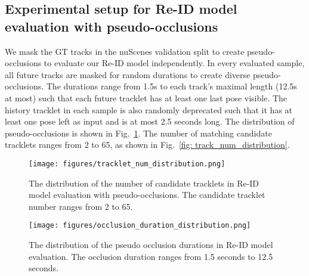 \documentclass{article} \usepackage{iclr2023_conference,times}
\begin{document}
\subsection{Experimental setup for Re-ID model evaluation with pseudo-occlusions}
\label{sec: Re-ID evaluation pseudo-occ setup}
We mask the GT tracks in the nuScenes validation split to create pseudo-occlusions to evaluate our Re-ID model independently. In every evaluated sample, all future tracks are masked for random durations to create diverse pseudo-occlusions. The durations range from 1.5s to each track's maximal length (12.5s at most) such that each future tracklet has at least one last pose visible. The history tracklet in each sample is also randomly deprecated such that it has at least one pose left as input and is at most 2.5 seconds long. The distribution of pseudo-occlusions is shown in Fig.~\ref{fig: psd_occ_length_distribution}. The number of matching candidate tracklets ranges from 2 to 65, as shown in Fig.~\ref{fig: track_num_distribution}.


\begin{figure}[htb]
   \begin{minipage}{0.48\textwidth}
     \centering
     \texttt{[image: figures/tracklet\_num\_distribution.png]}
    \caption{The distribution of the number of candidate tracklets in Re-ID model evaluation with pseudo-occlusions. The candidate tracklet number ranges from 2 to 65.}
    \label{fig: track_num_distribution}
   \end{minipage}\hfill
   \begin{minipage}{0.48\textwidth}
    \centering
    \texttt{[image: figures/occlusion\_duration\_distribution.png]}
    \caption{The distribution of the pseudo occlusion durations in Re-ID model evaluation. The occlusion duration ranges from 1.5 seconds to 12.5 seconds.}
    \label{fig: psd_occ_length_distribution}
   \end{minipage}
\end{figure}
\end{document}
